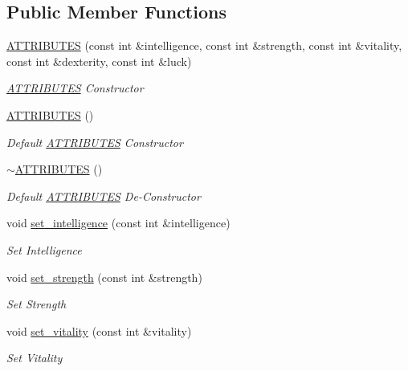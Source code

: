 \subsection*{Public Member Functions}
\begin{DoxyCompactItemize}
\item 
\mbox{\hyperlink{class_a_t_t_r_i_b_u_t_e_s_a8b2cd1e474988d7bf17679cc6c427c01}{A\+T\+T\+R\+I\+B\+U\+T\+ES}} (const int \&intelligence, const int \&strength, const int \&vitality, const int \&dexterity, const int \&luck)
\begin{DoxyCompactList}\small\item\em \mbox{\hyperlink{class_a_t_t_r_i_b_u_t_e_s}{A\+T\+T\+R\+I\+B\+U\+T\+ES}} Constructor \end{DoxyCompactList}\item 
\mbox{\hyperlink{class_a_t_t_r_i_b_u_t_e_s_a66b162d2497d7e9b6bb95b2f83d539db}{A\+T\+T\+R\+I\+B\+U\+T\+ES}} ()
\begin{DoxyCompactList}\small\item\em Default \mbox{\hyperlink{class_a_t_t_r_i_b_u_t_e_s}{A\+T\+T\+R\+I\+B\+U\+T\+ES}} Constructor \end{DoxyCompactList}\item 
\mbox{\hyperlink{class_a_t_t_r_i_b_u_t_e_s_ae2a7c145617a80e7367e2ed7c6fbd50a}{$\sim$\+A\+T\+T\+R\+I\+B\+U\+T\+ES}} ()
\begin{DoxyCompactList}\small\item\em Default \mbox{\hyperlink{class_a_t_t_r_i_b_u_t_e_s}{A\+T\+T\+R\+I\+B\+U\+T\+ES}} De-\/\+Constructor \end{DoxyCompactList}\item 
void \mbox{\hyperlink{class_a_t_t_r_i_b_u_t_e_s_a946921884bd0225ae95a29e66934a9e4}{set\+\_\+intelligence}} (const int \&intelligence)
\begin{DoxyCompactList}\small\item\em Set Intelligence \end{DoxyCompactList}\item 
void \mbox{\hyperlink{class_a_t_t_r_i_b_u_t_e_s_a53a4d269842f1989fda9865e3aa9c96f}{set\+\_\+strength}} (const int \&strength)
\begin{DoxyCompactList}\small\item\em Set Strength \end{DoxyCompactList}\item 
void \mbox{\hyperlink{class_a_t_t_r_i_b_u_t_e_s_a370dd1a2208caa2a88493ba418fd2fb7}{set\+\_\+vitality}} (const int \&vitality)
\begin{DoxyCompactList}\small\item\em Set Vitality \end{DoxyCompactList}\item 

\end{DoxyCompactItemize}
